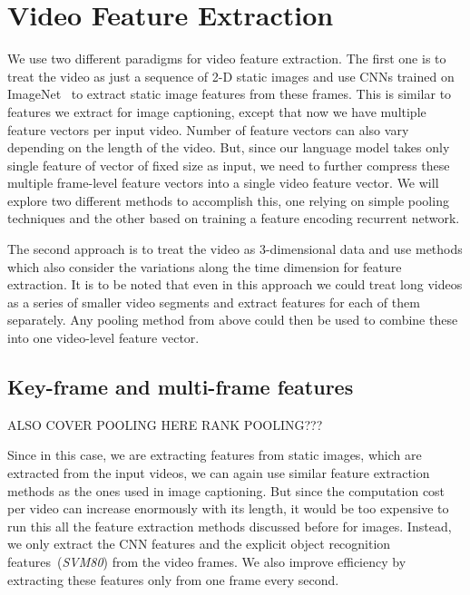 \section{Video Feature Extraction}
\label{sec:VideoFeat}
We use two different paradigms for video feature extraction.
The first one is to treat the video as just a sequence of 2-D static images and
use CNNs trained on ImageNet~\cite{ImagenetOrig} to extract static image
features from these frames.
This is similar to features we extract for image captioning, except that now we
have multiple feature vectors per input video.
Number of feature vectors can also vary depending on the length of the video.
But, since our language model takes only single feature of vector of fixed size
as input, we need to further compress these multiple frame-level feature vectors
into a single video feature vector. 
We will explore two different methods to accomplish this, one relying on simple
pooling techniques and the other based on training a feature encoding recurrent
network.

The second approach is to treat the video as 3-dimensional data and use methods
which also consider the variations along the time dimension for feature
extraction.
It is to be noted that even in this approach we could treat long videos as a
series of smaller video segments and extract features for each of them
separately.
Any pooling method from above could then be used to combine these into one
video-level feature vector.


\subsection{Key-frame and multi-frame features}
ALSO COVER POOLING HERE
RANK POOLING???

Since in this case, we are extracting features from static images, which are
extracted from the input videos, we can again use similar feature extraction
methods as the ones used in image captioning.
But since the computation cost per video can increase enormously with its
length, it would be too expensive to run this all the feature extraction methods
discussed before for images.
Instead, we only extract the CNN features and the explicit object recognition
features~(\emph{SVM80}) from the video frames.
We also improve efficiency by extracting these features only from one frame
every second.

